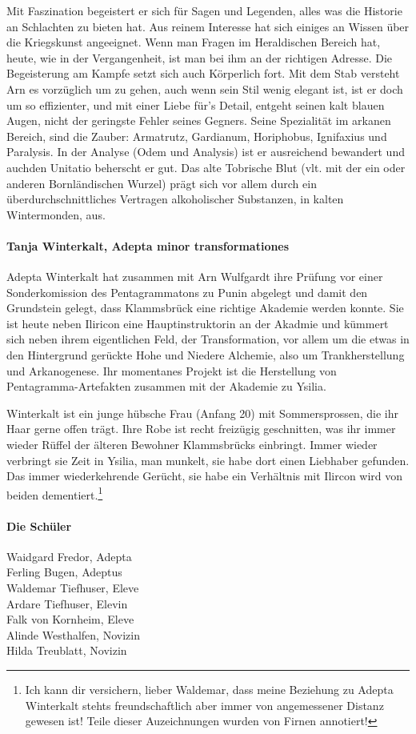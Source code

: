 Mit Faszination begeistert er sich für Sagen und Legenden, alles was die Historie an Schlachten zu bieten hat. Aus reinem Interesse hat sich einiges an Wissen über die Kriegskunst angeeignet. Wenn man Fragen im Heraldischen Bereich hat, heute, wie in der Vergangenheit, ist man bei ihm an der richtigen Adresse.
Die Begeisterung am Kampfe setzt sich auch Körperlich fort. Mit dem Stab versteht Arn es vorzüglich um zu gehen, auch wenn sein Stil wenig elegant ist, ist er doch um so effizienter, und mit einer Liebe für's Detail, entgeht seinen kalt blauen Augen, nicht der geringste Fehler seines Gegners.
Seine Spezialität im arkanen Bereich, sind die Zauber: Armatrutz, Gardianum, Horiphobus, Ignifaxius und Paralysis. In der Analyse (Odem und Analysis) ist er ausreichend bewandert und auchden Unitatio beherscht er gut.
Das alte Tobrische Blut (vlt. mit der ein oder anderen Bornländischen Wurzel) prägt sich vor allem durch ein überdurchschnittliches Vertragen alkoholischer Substanzen, in kalten Wintermonden, aus. 

\paragraph{Tanja Winterkalt, Adepta minor transformationes}
Adepta Winterkalt hat zusammen mit Arn Wulfgardt ihre Prüfung vor einer Sonderkomission des Pentagrammatons zu Punin abgelegt und damit den Grundstein gelegt, dass Klammsbrück eine richtige Akademie werden konnte. Sie ist heute neben Iliricon eine Hauptinstruktorin an der Akadmie und kümmert sich neben ihrem eigentlichen Feld, der Transformation, vor allem um die etwas in den Hintergrund gerückte Hohe und Niedere Alchemie, also um Trankherstellung und Arkanogenese. Ihr momentanes Projekt ist die Herstellung von Pentagramma-Artefakten zusammen mit der Akademie zu Ysilia.

Winterkalt ist ein junge hübsche Frau (Anfang 20) mit Sommersprossen, die ihr Haar gerne offen trägt. Ihre Robe ist recht freizügig geschnitten, was ihr immer wieder Rüffel der älteren Bewohner Klammsbrücks einbringt. Immer wieder verbringt sie Zeit in Ysilia, man munkelt, sie habe dort einen Liebhaber gefunden. Das immer wiederkehrende Gerücht, sie habe ein Verhältnis mit Ilircon wird von beiden dementiert.\footnote{Ich kann dir versichern, lieber Waldemar, dass meine Beziehung zu Adepta Winterkalt stehts freundschaftlich aber immer von angemessener Distanz gewesen ist! Teile dieser Auzeichnungen wurden von Firnen annotiert!}

\paragraph{Die Schüler}
Waidgard Fredor, Adepta\\
Ferling Bugen, Adeptus\\
Waldemar Tiefhuser, Eleve\\
Ardare Tiefhuser, Elevin\\
Falk von Kornheim, Eleve\\
Alinde Westhalfen, Novizin\\
Hilda Treublatt, Novizin

